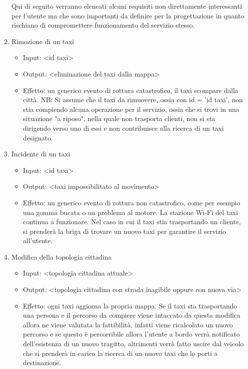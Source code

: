 \begin{enumerate}
	Qui di seguito verranno elencati alcuni requisiti non direttamente interessanti per l'utente ma che sono importanti da definire per la progettazione in quanto rischiano di compromettere funzionamento del servizio stesso.
	
	\item Rimozione di un taxi
		\begin{itemize}
			\item Input: <id taxi>
			\item Output: <eliminazione del taxi dalla mappa>
			\item Effetto: un generico evento di rottura catastrofico, il taxi scompare dalla città. NB: Si assume che il taxi da rimuovere, ossia con id = 'id taxi', non stia compiendo alcuna operazione per il servizio, ossia che si trovi in una situazione "a riposo", nella quale non trasporta clienti, non si sta dirigendo verso uno di essi e non contribuisce alla ricerca di un taxi designato.
		\end{itemize}
	
	\item Incidente di un taxi
	\begin{itemize}
		\item Input: <id taxi>
		\item Output: <taxi impossibilitato al movimento>
		\item Effetto: un generico evento di rottura non catastrofico, come per esempio una gomma bucata o un problema al motore. La stazione Wi-Fi del taxi continua a funzionare. Nel caso in cui il taxi stia trasportando un cliente, si prenderà la briga di trovare un nuovo taxi per garantire il servizio all'utente.
	\end{itemize}

	\item Modifica della topologia cittadina
		\begin{itemize}
			\item Input: <topologia cittadina attuale>
			\item Output: <topologia cittadina con strada inagibile oppure con nuova via>
			\item Effetto: ogni taxi aggiorna la propria mappa. Se il taxi sta trasportando una persona e il percorso da compiere viene intaccato da questa modifica allora ne viene valutata la fattibilità, infatti viene ricalcolato un nuovo percorso e se questo è percorribile allora l'utente a bordo verrà notificato dell'esistenza di un nuovo tragitto, altrimenti verrà fatto uscire dal veicolo che si prenderà in carico la ricerca di un nuovo taxi che lo porti a destinazione.
		\end{itemize}

\end{enumerate}

